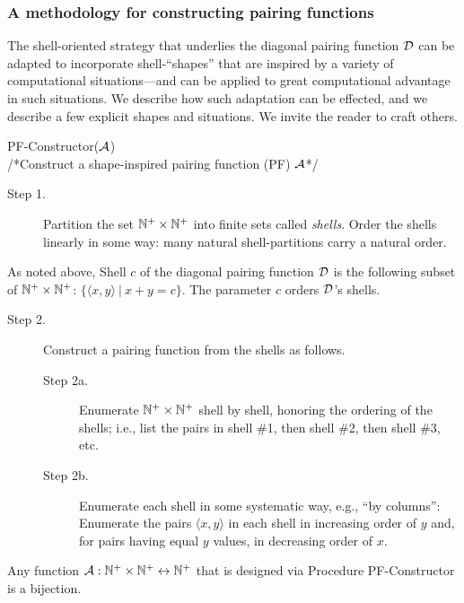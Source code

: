 \subsubsection{A methodology for constructing pairing functions}
\label{sec:build-pair-fn}

The shell-oriented strategy that underlies the diagonal pairing
function $\mbox{$\cal D$}$ can be adapted to incorporate shell-``shapes'' that are
inspired by a variety of computational situations---and can be applied
to great computational advantage in such situations.  We describe how
such adaptation can be effected, and we describe a few explicit shapes
and situations.  We invite the reader to craft others.

\medskip

 {\small\sf PF-Constructor}($\mbox{$\cal A$}$) \\
/*Construct a shape-inspired pairing function (PF) $\mbox{$\cal A$}$*/
\begin{description}
\item[Step 1.]
%
Partition the set $\mathbb{N}^+ \times \mathbb{N}^+$ into finite sets called {\it
  shells}.  Order the shells linearly in some way: many natural
shell-partitions carry a natural order.
\end{description}
As noted above, Shell $c$ of the diagonal pairing function $\mbox{$\cal D$}$ is the
following subset of $\mathbb{N}^+ \times \mathbb{N}^+$: $\{ \langle x,y \rangle \ |
\ x+y = c \}$.  The parameter $c$ orders $\mbox{$\cal D$}$'s shells.

\begin{description}
\item[Step 2.]
Construct a pairing function from the shells as follows.
  \begin{description}
  \item[Step 2a.]
Enumerate $\mathbb{N}^+ \times \mathbb{N}^+$ shell by shell, honoring the ordering of
the shells; i.e., list the pairs in shell \#1, then shell \#2, then
shell \#3, etc.
  \item[Step 2b.]
Enumerate each shell in some systematic way, e.g., ``by columns'':
Enumerate the pairs $\langle x,y \rangle$ in each shell in increasing
order of $y$ and, for pairs having equal $y$ values, in decreasing
order of $x$.
  \end{description}
\end{description}

\begin{prop}
\label{thm:PF-construct}
Any function $\mbox{$\cal A$}: \mathbb{N}^+ \times \mathbb{N}^+ \leftrightarrow \mathbb{N}^+$ that is
designed via Procedure {\small\sf PF-Constructor} is a bijection.
\end{prop}

